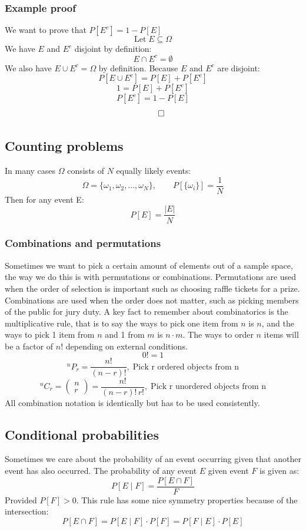 \documentclass[12pt]{article}
\newcommand*{\Perm}[2]{{}^{#1}\!P_{#2}}%
\newcommand*{\Comb}[2]{{}^{#1}C_{#2}}%
\begin{document}
\subsubsection*{Example proof}
We want to prove that \(P[E^c]=1-P[E]\)
\[\text{Let}\;E\subseteq\Omega\]
We have \(E\) and \(E^c\) disjoint by definition:
\[E\cap E^c=\emptyset\]
We also have \(E\cup E^c=\Omega\) by definition. Because \(E\) and \(E^c\) are disjoint:
\[P[E\cup E^c]=P[E]+P[E^c]\]
\[1=P[E]+P[E^c]\]
\[P[E^c]=1-P[E]\]
\[\qed\]
\subsection*{Counting problems}
In many cases \(\Omega\) consists of \(N\) equally likely events:
\[\Omega=\{\omega_1,\omega_2,...,\omega_N\},\qquad P[\{\omega_i\}]=\frac{1}{N}\]
Then for any event E:
\[P[E]=\frac{\vert E\vert}{N}\]
\subsubsection*{Combinations and permutations}
Sometimes we want to pick a certain amount of elements out of a sample space, the way we do this is with permutations or combinations. Permutations are used when the order of selection is important such as choosing raffle tickets for a prize. Combinations are used when the order does not matter, such as picking members of the public for jury duty. A key fact to remember about combinatorics is the multiplicative rule, that is to say the ways to pick one item from \(n\) is \(n\), and the ways to pick 1 item from \(n\) and 1 from \(m\) is \(n\cdot m\). The ways to order \(n\) items will be a factor of \(n!\) depending on external conditions.
\[0!=1\]
\[\Perm{n}{r}=\frac{n!}{(n-r)!},\;\text{Pick r ordered objects from n}\]
\[\Comb{n}{r}=\begin{pmatrix}
    n\\
    r
\end{pmatrix}=\frac{n!}{(n-r)!\,r!},\;\text{Pick r unordered objects from n}\]
All combination notation is identically but has to be used consistently.
\subsection*{Conditional probabilities}
Sometimes we care about the probability of an event occurring given that another event has also occurred. The probability of any event \(E\) given event \(F\) is given as:
\[P[E\mid F]=\frac{P[E\cap F]}{F}\]
Provided \(P[F]>0\). This rule has some nice symmetry properties because of the intersection:
\[P[E\cap F]=P[E\mid F]\cdot P[F]=P[F\mid E]\cdot P[E]\]
\end{document}
